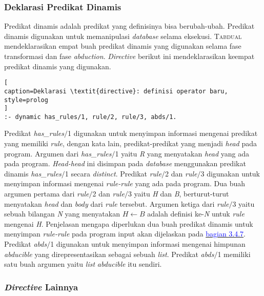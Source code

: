 \subsubsection{Deklarasi Predikat Dinamis}

Predikat dinamis adalah predikat yang definisinya bisa berubah-ubah. Predikat dinamis digunakan untuk memanipulasi \textit{database} selama eksekusi. \textsc{Tabdual} mendeklarasikan empat buah predikat dinamis yang digunakan selama fase transformasi dan fase \textit{abduction}. \textit{Directive} berikut ini mendeklarasikan keempat predikat dinamis yang digunakan. 
\\

\begin{lstlisting}[
caption=Deklarasi \textit{directive}: definisi operator baru,
style=prolog
]
:- dynamic has_rules/1, rule/2, rule/3, abds/1.
\end{lstlisting}

Predikat \textit{has\_rules$/$}1 digunakan untuk menyimpan informasi mengenai predikat yang memiliki \textit{rule}, dengan kata lain, predikat-predikat yang menjadi \textit{head} pada program. Argumen dari \textit{has\_rules$/$}1 yaitu \textit{R} yang menyatakan \textit{head} yang ada pada program. \textit{Head-head} ini disimpan pada \textit{database} menggunakan predikat dinamis \textit{has\_rules$/$}1 secara \textit{distinct}. Predikat \textit{rule$/$}2 dan \textit{rule$/$}3 digunakan untuk menyimpan informasi mengenai \textit{rule-rule} yang ada pada program. Dua buah argumen pertama dari \textit{rule$/$}2 dan \textit{rule$/$}3 yaitu \textit{H} dan \textit{B}, berturut-turut menyatakan \textit{head} dan \textit{body} dari \textit{rule} tersebut. Argumen ketiga dari \textit{rule$/$}3 yaitu sebuah bilangan \textit{N} yang menyatakan \textit{$H \leftarrow B$} adalah definisi ke-\textit{N} untuk \textit{rule} mengenai \textit{H}.\label{rule2to3} Penjelasan mengapa diperlukan dua buah predikat dinamis untuk menyimpan \textit{rule-rule} pada program input akan dijelaskan pada \hyperref[subsec:add_indices]{\textcolor{blue}{bagian 3.4.7}}. Predikat \textit{abds$/$}1 digunakan untuk menyimpan informasi mengenai himpunan \textit{abducible} yang direpresentasikan sebagai sebuah \textit{list}. Predikat \textit{abds$/$}1 memiliki satu buah argumen yaitu \textit{list} \textit{abducible} itu sendiri.

\subsubsection{\textit{Directive} Lainnya}

